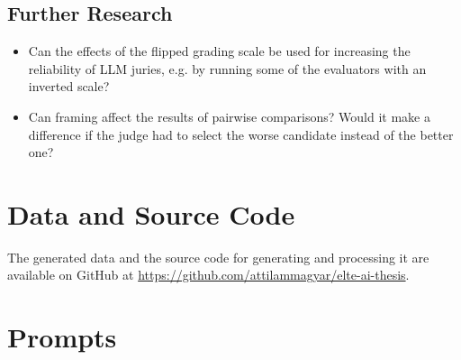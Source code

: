 \documentclass[UTF8,noindent,nohyp,parspace,titlepage,a4paper,12pt]{article}
\begin{document}
    \subsection{Further Research}

      \begin{itemize}
        \item Can the effects of the flipped grading scale be used for
              increasing the reliability of LLM juries, e.g. by running some of
              the evaluators with an inverted scale?

        \item Can framing affect the results of pairwise comparisons? Would it
              make a difference if the judge had to select the worse candidate
              instead of the better one?
      \end{itemize}

\clearpage

  \appendix

  \section{Data and Source Code}

    The generated data and the source code for generating and processing it
    are available on GitHub at \url{https://github.com/attilammagyar/elte-ai-thesis}.

\clearpage

  \section{Prompts}
\end{document}
